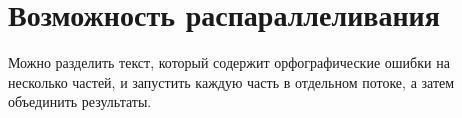 \chapter*{\hfill{\centering Возможность распараллеливания}\hfill}

Можно разделить текст, который содержит орфографические ошибки на несколько частей, и запустить каждую часть в отдельном потоке, а затем объединить результаты.